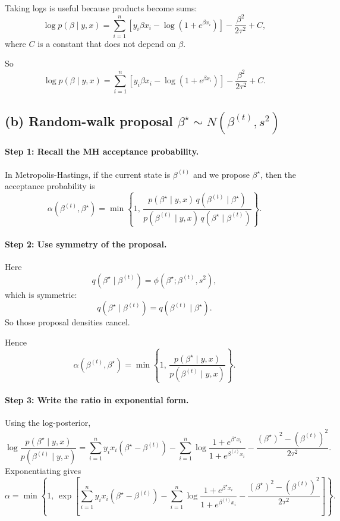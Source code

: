 \documentclass[11pt]{article}
\begin{document}
Taking logs is useful because products become sums:
\[
\log p(\beta\mid y,x)
=
\sum_{i=1}^n
\left[
y_i\beta x_i-\log(1+e^{\beta x_i})
\right]
-\frac{\beta^2}{2\tau^2}
+C,
\]
where $C$ is a constant that does not depend on $\beta$.

So
\[
\boxed{
\log p(\beta\mid y,x)
=
\sum_{i=1}^n
\left[
y_i\beta x_i-\log(1+e^{\beta x_i})
\right]
-\frac{\beta^2}{2\tau^2}
+C.
}
\]

\subsection*{(b) Random-walk proposal $\beta^\star\sim N(\beta^{(t)},s^2)$}

\paragraph{Step 1: Recall the MH acceptance probability.}

In Metropolis-Hastings, if the current state is $\beta^{(t)}$ and we propose $\beta^\star$, then the acceptance probability is
\[
\alpha(\beta^{(t)},\beta^\star)
=
\min\left\{
1,\,
\frac{p(\beta^\star\mid y,x)\,q(\beta^{(t)}\mid \beta^\star)}
{p(\beta^{(t)}\mid y,x)\,q(\beta^\star\mid \beta^{(t)})}
\right\}.
\]

\paragraph{Step 2: Use symmetry of the proposal.}

Here
\[
q(\beta^\star\mid \beta^{(t)})=\phi(\beta^\star;\beta^{(t)},s^2),
\]
which is symmetric:
\[
q(\beta^\star\mid \beta^{(t)})
=
q(\beta^{(t)}\mid \beta^\star).
\]
So those proposal densities cancel.

Hence
\[
\boxed{
\alpha(\beta^{(t)},\beta^\star)
=
\min\left\{
1,\,
\frac{p(\beta^\star\mid y,x)}{p(\beta^{(t)}\mid y,x)}
\right\}.
}
\]

\paragraph{Step 3: Write the ratio in exponential form.}

Using the log-posterior,
\[
\log\frac{p(\beta^\star\mid y,x)}{p(\beta^{(t)}\mid y,x)}
=
\sum_{i=1}^n y_i x_i(\beta^\star-\beta^{(t)})
-
\sum_{i=1}^n
\log\frac{1+e^{\beta^\star x_i}}{1+e^{\beta^{(t)}x_i}}
-
\frac{(\beta^\star)^2-(\beta^{(t)})^2}{2\tau^2}.
\]
Exponentiating gives
\[
\alpha
=
\min\left\{
1,\,
\exp\left[
\sum_{i=1}^n y_i x_i(\beta^\star-\beta^{(t)})
-
\sum_{i=1}^n
\log\frac{1+e^{\beta^\star x_i}}{1+e^{\beta^{(t)}x_i}}
-
\frac{(\beta^\star)^2-(\beta^{(t)})^2}{2\tau^2}
\right]
\right\}.
\]
\end{document}
